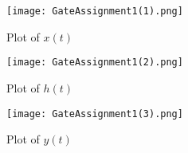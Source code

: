 \documentclass[journal,12pt,twocolumn]{IEEEtran}
\begin{document}
\begin{figure}[!h]
 \centering
 \texttt{[image: GateAssignment1(1).png]}
 \caption{Plot of $x(t)$}
 \label{plot}
\end{figure}

\begin{figure}[!h]
 \centering
 \texttt{[image: GateAssignment1(2).png]}
 \caption{Plot of $h(t)$}
 \label{plot}
\end{figure}

\begin{figure}[!h]
 \centering
 \texttt{[image: GateAssignment1(3).png]}
 \caption{Plot of $y(t)$}
 \label{plot}
\end{figure}
\end{document}
